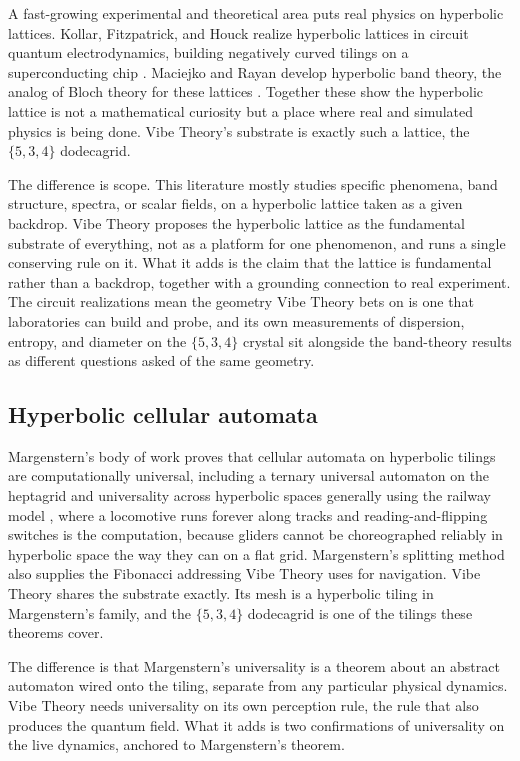 A fast-growing experimental and theoretical area puts real physics on hyperbolic lattices. Kollar,
Fitzpatrick, and Houck realize hyperbolic lattices in circuit quantum electrodynamics, building negatively
curved tilings on a superconducting chip \cite{kollar2019}. Maciejko and Rayan develop hyperbolic band
theory, the analog of Bloch theory for these lattices \cite{maciejko2021}. Together these show the hyperbolic
lattice is not a mathematical curiosity but a place where real and simulated physics is being done. Vibe
Theory's substrate is exactly such a lattice, the $\{5,3,4\}$ dodecagrid.

The difference is scope. This literature mostly studies specific phenomena, band structure, spectra, or scalar
fields, on a hyperbolic lattice taken as a given backdrop. Vibe Theory proposes the hyperbolic lattice as the
fundamental substrate of everything, not as a platform for one phenomenon, and runs a single conserving rule on
it. What it adds is the claim that the lattice is fundamental rather than a backdrop, together with a grounding
connection to real experiment. The circuit realizations mean the geometry Vibe Theory bets on is one that
laboratories can build and probe, and its own measurements of dispersion, entropy, and diameter on the
$\{5,3,4\}$ crystal sit alongside the band-theory results as different questions asked of the same geometry.

\subsection{Hyperbolic cellular automata}

Margenstern's body of work proves that cellular automata on hyperbolic tilings are computationally universal,
including a ternary universal automaton on the heptagrid \cite{margenstern2008} and universality across
hyperbolic spaces generally using the railway model \cite{margenstern2013}, where a locomotive runs forever
along tracks and reading-and-flipping switches is the computation, because gliders cannot be choreographed
reliably in hyperbolic space the way they can on a flat grid. Margenstern's splitting method also supplies
the Fibonacci addressing Vibe Theory uses for navigation. Vibe Theory shares the substrate exactly. Its mesh
is a hyperbolic tiling in Margenstern's family, and the $\{5,3,4\}$ dodecagrid is one of the tilings these
theorems cover.

The difference is that Margenstern's universality is a theorem about an abstract automaton wired onto the
tiling, separate from any particular physical dynamics. Vibe Theory needs universality on its own perception
rule, the rule that also produces the quantum field. What it adds is two confirmations of universality on the
live dynamics, anchored to Margenstern's theorem.

